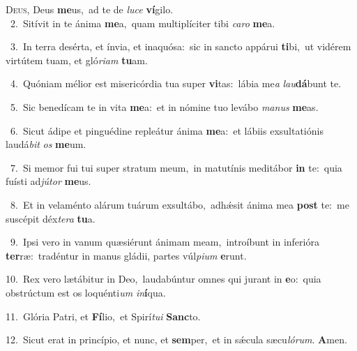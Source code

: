 \lettrine{\initial\textcolor{\initialcolor}{D}}{eus,} Deus \textbf{me}\-us,~\star ad te de \textit{lu}\-\textit{ce} \textbf{ví}\-gilo.\\
{\numbfont\textcolor{\numbcolor}{~2.}}~Sitívit in te ánima \textbf{me}\-a,~\star quam multiplíciter tibi \textit{ca}\-\textit{ro} \textbf{me}\-a.\par
{\numbfont\textcolor{\numbcolor}{~3.}}~In terra desérta, et ínvia, et inaquósa:~\dagger sic in sancto appárui \textbf{ti}\-bi,~\star ut vidérem virtútem tuam, et gló\-\textit{ri}\-\textit{am} \textbf{tu}\-am.\par
{\numbfont\textcolor{\numbcolor}{~4.}}~Quóniam mélior est misericórdia tua super \textbf{vi}\-tas:~\star lábia me\textit{a} \textit{lau}\-\textbf{dá}bunt te.\par
{\numbfont\textcolor{\numbcolor}{~5.}}~Sic benedícam te in vita \textbf{me}\-a:~\star et in nómine tuo levábo \textit{ma}\-\textit{nus} \textbf{me}\-as.\par
{\numbfont\textcolor{\numbcolor}{~6.}}~Sicut ádipe et pinguédine repleátur ánima \textbf{me}\-a:~\star et lábiis exsultatiónis laudá\textit{bit} \textit{os} \textbf{me}\-um.\par
{\numbfont\textcolor{\numbcolor}{~7.}}~Si memor fui tui super stratum meum,~\dagger in matutínis meditábor \textbf{in} te:~\star quia fuísti ad\-\textit{jú}\-\textit{tor} \textbf{me}\-us.\par
{\numbfont\textcolor{\numbcolor}{~8.}}~Et in velaménto alárum tuárum exsultábo,~\dagger adhǽsit ánima mea \textbf{post} te:~\star me suscépit déx\-\textit{te}\-\textit{ra} \textbf{tu}\-a.\par
{\numbfont\textcolor{\numbcolor}{~9.}}~Ipsi vero in vanum quæsiérunt ánimam meam,~\dagger introíbunt in inferióra \textbf{ter}\-ræ:~\star tradéntur in manus gládii, partes vúl\-\textit{pi}\-\textit{um} \textbf{e}\-runt.\par
{\numbfont\textcolor{\numbcolor}{10.}}~Rex vero lætábitur in Deo,~\dagger laudabúntur omnes qui jurant in \textbf{e}\-o:~\star quia obstrúctum est os loquénti\textit{um} \textit{in}\-\textbf{í}qua.\par
{\numbfont\textcolor{\numbcolor}{11.}}~Glória Patri, et \textbf{Fí}\-lio,~\star et Spirí\-\textit{tu}\-\textit{i} \textbf{Sanc}\-to.\par
{\numbfont\textcolor{\numbcolor}{12.}}~Sicut erat in princípio, et nunc, et \textbf{sem}\-per,~\star et in sǽcula sæcu\-\textit{ló}\-\textit{rum}. \textbf{A}\-men.\par
